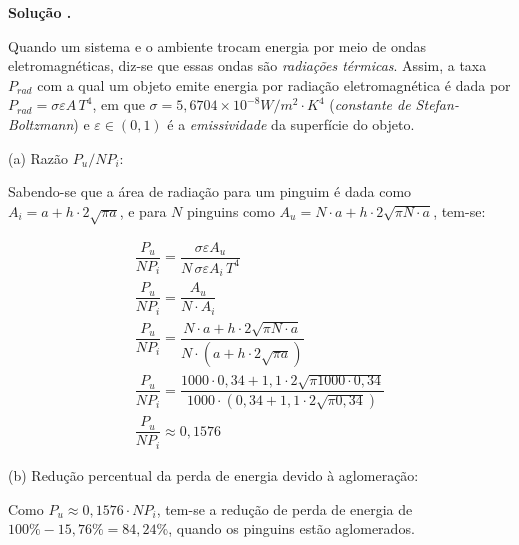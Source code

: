 \documentclass[a4paper, 12pt]{article}
\newenvironment{solving}[1][\unskip]{%
\vspace{0.2cm}

\noindent\textbf{ Solução #1.}
\vspace{0.1cm}

}
{}
\begin{document}
\begin{solving}
Quando um sistema e o ambiente trocam energia por meio de ondas eletromagnéticas, diz-se que essas ondas são \emph{radiações térmicas}. Assim, a taxa $P_{rad}$ com a qual um objeto emite energia por radiação eletromagnética é dada por $P_{rad}=\sigma \varepsilon A\, T^{4}$, em que $\sigma=5,6704 \times 10^{-8} W/m^2\cdot K^4$ (\emph{constante de Stefan-Boltzmann}) e $\varepsilon \in (0,1)$ é a \emph{emissividade} da superfície do objeto.
\vspace{0.3cm}

\noindent (a) Razão $P_{u}/NP_{i}$:

Sabendo-se que a área de radiação para um pinguim é dada como $A_{i}=a+h\cdot 2\sqrt{\pi a}$, e para $N$ pinguins como $A_{u}=N\cdot a+h\cdot 2 \sqrt{\pi N\cdot a}$, tem-se:

\begin{gather*}
\dfrac{P_{u}}{NP_{i}}= \dfrac{\sigma \varepsilon A_u}{N\, \sigma \varepsilon A_i\, T^{4} }\\
\dfrac{P_{u}}{NP_{i}}= \dfrac{A_u}{N\cdot A_i}\\
\dfrac{P_{u}}{NP_{i}}= \dfrac{N\cdot a+h\cdot 2 \sqrt{\pi N\cdot a}}{N\cdot (a+h\cdot 2\sqrt{\pi a})}\\
\dfrac{P_{u}}{NP_{i}}= \dfrac{1000\cdot 0,34+1,1\cdot 2 \sqrt{\pi 1000\cdot 0,34}}{1000\cdot (0,34+1,1\cdot 2\sqrt{\pi 0,34})}\\
\dfrac{P_{u}}{NP_{i}}\approx 0,1576
\end{gather*}
\vspace{0.3cm}

\noindent (b) Redução percentual da perda de energia devido à aglomeração:

Como $P_{u}\approx 0,1576\cdot NP_{i}$, tem-se a redução de perda de energia de $100\%-15,76\%=84,24\%$, quando os pinguins estão aglomerados.
\end{solving}
\end{document}
